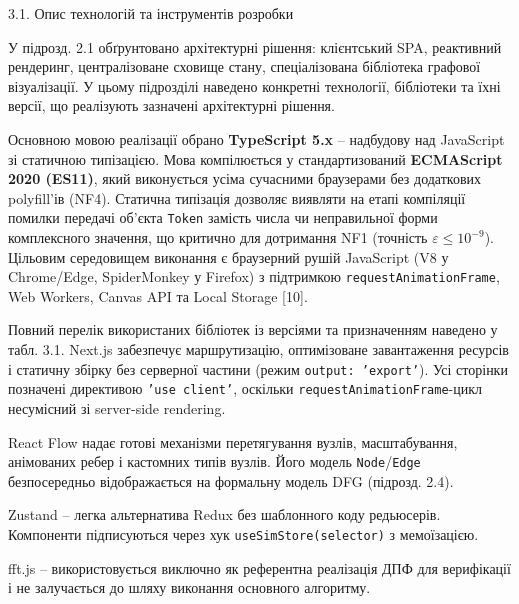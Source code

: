 \documentclass[
]{article}
\newcommand{\passthrough}[1]{#1}
\begin{document}
\protect{}\label{X730c05323598ba45792da5fe42961130cedb25e}{}3.1.
Опис технологій та інструментів розробки

У підрозд. 2.1 обґрунтовано архітектурні рішення: клієнтський SPA,
реактивний рендеринг, централізоване сховище стану, спеціалізована
бібліотека графової візуалізації. У цьому підрозділі наведено конкретні
технології, бібліотеки та їхні версії, що реалізують зазначені
архітектурні рішення.

Основною мовою реалізації обрано \textbf{TypeScript 5.x} -- надбудову
над JavaScript зі статичною типізацією. Мова компілюється у
стандартизований \textbf{ECMAScript 2020 (ES11)}, який виконується усіма
сучасними браузерами без додаткових polyfill'ів (NF4). Статична
типізація дозволяє виявляти на етапі компіляції помилки передачі об'єкта
\passthrough{\lstinline!Token!} замість числа чи неправильної форми
комплексного значення, що критично для дотримання NF1 (точність
\(\varepsilon \leq 10^{- 9}\)). Цільовим середовищем виконання є
браузерний рушій JavaScript (V8 у Chrome/Edge, SpiderMonkey у Firefox) з
підтримкою \passthrough{\lstinline!requestAnimationFrame!}, Web Workers,
Canvas API та Local Storage {[}10{]}.

Повний перелік використаних бібліотек із версіями та призначенням
наведено у табл. 3.1. Next.js забезпечує маршрутизацію, оптимізоване
завантаження ресурсів і статичну збірку без серверної частини (режим
\passthrough{\lstinline!output!}\passthrough{\lstinline!:!}\passthrough{\lstinline! !}\passthrough{\lstinline!’!}\passthrough{\lstinline!export!}\passthrough{\lstinline!’!}).
Усі сторінки позначені директивою
\passthrough{\lstinline!’!}\passthrough{\lstinline!use!}\passthrough{\lstinline! !}\passthrough{\lstinline!client!}\passthrough{\lstinline!’!},
оскільки \passthrough{\lstinline!requestAnimationFrame!}-цикл несумісний
зі server-side rendering.

React Flow надає готові механізми перетягування вузлів, масштабування,
анімованих ребер і кастомних типів вузлів. Його модель
\passthrough{\lstinline!Node!}/\passthrough{\lstinline!Edge!}
безпосередньо відображається на формальну модель DFG (підрозд. 2.4).

Zustand -- легка альтернатива Redux без шаблонного коду редьюсерів.
Компоненти підписуються через хук
\passthrough{\lstinline!useSimStore!}\passthrough{\lstinline!(!}\passthrough{\lstinline!selector!}\passthrough{\lstinline!)!}
з мемоїзацією.

fft.js -- використовується виключно як референтна реалізація ДПФ для
верифікації і не залучається до шляху виконання основного алгоритму.
\end{document}
